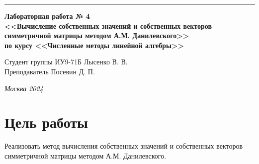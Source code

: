 \documentclass[a4paper, 14pt]{extarticle}
\begin{document}
\begin{titlepage}
\vspace*{-16pt}
\hspace{30pt}\rule{0.866\textwidth}{0.4pt}
  
\vspace{11em}

\begin{center}
\Large {\bf Лабораторная работа № 4} \\ 
\large {\bf<<Вычисление собственных значений и собственных векторов симметричной матрицы методом А.М. Данилевского>>} \\ 
\large {\bf по курсу <<Численные методы линейной алгебры>>} \\ 
\end{center}\normalsize

\vspace{8em}


\begin{flushright}
  {Студент группы ИУ9-71Б Лысенко В. В.\hspace*{15pt} \\
  \vspace{2ex}
  Преподаватель Посевин Д. П.\hspace*{15pt}}
\end{flushright}

\bigskip

\vfill
 

\begin{center}
\textsl{Москва 2024}
\end{center}
\end{titlepage}

\renewcommand{\ttdefault}{pcr}

\setlength{\tabcolsep}{3pt}
\newpage
\setcounter{page}{2}

\section{Цель работы}\label{Sect::task}
\par
\renewcommand{\labelenumii}{\arabic{enumi}.\arabic{enumii}.}
Реализовать метод вычисления собственных значений и собственных векторов симметричной матрицы методом А.М. Данилевского.
\end{document}
